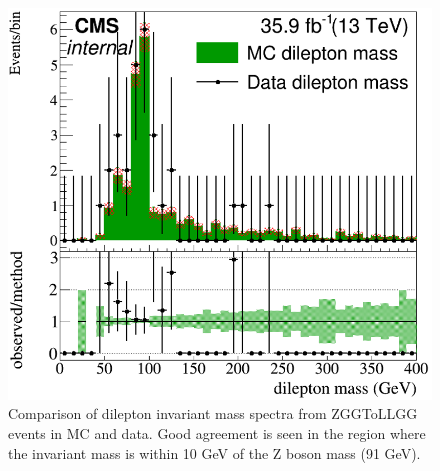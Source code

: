 \begin{figure}[h]
	\centering
	\includegraphics[width=0.7\linewidth]{Figures/ZGGtonunuGG_2016_fullmass}
	\caption[Comparison of ZGGToLLGG MC to data]{Comparison of dilepton invariant mass spectra from ZGGToLLGG events in MC and data.  Good agreement is seen in the region where the invariant mass is within 10 GeV of the Z boson mass (91 GeV).}
	\label{fig:zggtonunugg2016fullmass}
\end{figure}






